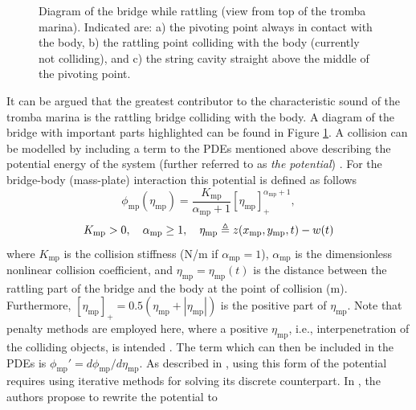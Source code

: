\begin{figure}[b]
        \caption{Diagram of the bridge while rattling (view from top of the tromba marina). Indicated are: a) the pivoting point always in contact with the body, b) the rattling point colliding with the body (currently not colliding), and c) the string cavity straight above the middle of the pivoting point.}
        \label{fig:bridgeDiagram}
    \end{figure}
    It can be argued that the greatest contributor to the characteristic sound of the tromba marina is the rattling bridge colliding with the body. A diagram of the bridge with important parts highlighted can be found in Figure \ref{fig:bridgeDiagram}. A collision can be modelled by including a term to the PDEs mentioned above describing the potential energy of the system (further referred to as \textit{the potential}) \cite{Ducceschi2019}. For the bridge-body (mass-plate) interaction this potential is defined as follows %
    \begin{equation}\label{eq:potential}
        \phi_\text{mp}(\eta_\text{mp}) = \frac{K_\text{mp}}{\alpha_\text{mp}+1}[\eta_\text{mp}]_+^{\alpha_\text{mp}+1},
    \end{equation}
    \begin{equation*}
        K_\text{mp}>0, \quad \alpha_\text{mp}\geq 1, \quad \eta_\text{mp}\triangleq z(x_\text{mp},y_\text{mp},t) - w(t)
    \end{equation*}
    where $K_\text{mp}$ is the collision stiffness (N/m if $\alpha_\text{mp} = 1$), $\alpha_\text{mp}$ is the dimensionless nonlinear collision coefficient, and $\eta_\text{mp} = \eta_\text{mp}(t)$ is the distance between the rattling part of the bridge and the body at the point of collision (m). Furthermore, $[\eta_\text{mp}]_+ = 0.5(\eta_\text{mp}+|\eta_\text{mp}|)$ is the positive part of $\eta_\text{mp}$. Note that penalty methods are employed here, where a positive $\eta_\text{mp}$, i.e., interpenetration of the colliding objects, is intended \cite{bilbao2014:SMC2020}. The term which can then be included in the PDEs is $\phi_\text{mp}' = d\phi_\text{mp}/d\eta_\text{mp}$. As described in \cite{Lopes:SMC2020, Falaize2016a:SMC2020, Falaize2016b:SMC2020, Ducceschi2019}, using this form of the potential requires using iterative methods for solving its discrete counterpart. In \cite{Ducceschi2019}, the authors propose to rewrite the potential to
